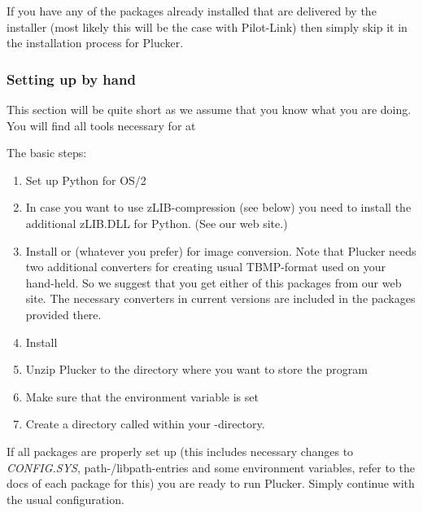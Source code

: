 \note If you have any of the packages already installed that are
delivered by the installer (most likely this will be the case with
Pilot-Link) then simply skip it in the installation process for
Plucker.


\subsubsection{Setting up by hand}

This section will be quite short as we assume that you know what you
are doing. You will find all tools necessary for at
\textit{}

The basic steps:

\begin{enumerate}
  \item Set up Python for OS/2

  \item In case you want to use zLIB-compression (see below) you need
  to install the additional zLIB.DLL for Python. (See our web site.)

  \item Install  or  (whatever you
  prefer) for image conversion. Note that Plucker needs two additional
  converters for creating usual TBMP-format used on your hand-held. So
  we suggest that you get either of this packages from our web site.
  The necessary converters in current versions are included in the
  packages provided there.

  \item Install 

  \item Unzip Plucker to the directory where you want to store the
  program

  \item Make sure that the environment variable  is set

  \item Create a directory called  within your
  -directory.

\end{enumerate}

If all packages are properly set up (this includes necessary changes
to \textit{CONFIG.SYS}, path-/libpath-entries and some environment
variables, refer to the docs of each package for this) you are ready
to run Plucker. Simply continue with the usual configuration.\\

